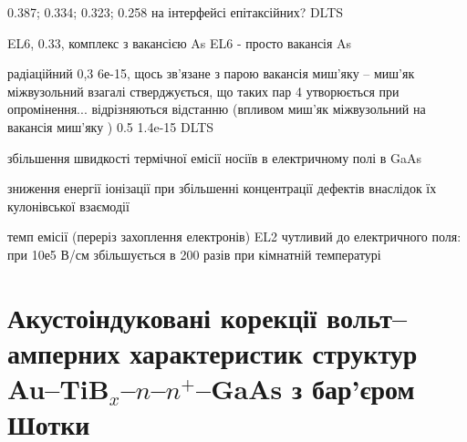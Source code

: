 \documentclass[a4paper,14pt,oneside,openany]{memoir}
\begin{document}
0.387; 0.334; 0.323; 0.258 на інтерфейсі епітаксійних?
DLTS
\cite{Yousefi1995}

EL6, 0.33, комплекс з вакансією As \cite{EL6:Richter}
EL6 - просто вакансія As \cite{EL6:Schultz}

радіаційний 0,3 6е-15, щось зв'язане з парою вакансія миш'яку -- миш'як міжвузольний
взагалі стверджується, що таких пар 4 утворюється при опромінення... відрізняються відстанню (впливом миш'як міжвузольний на вакансія миш'яку )
0.5 1.4e-15
DLTS
\cite{Pons}

збільшення швидкості термічної емісії носіїв в електричному полі в GaAs \cite{Bulyarskii2000r,Makram}

зниження енергії іонізації при збільшенні концентрації дефектів внаслідок їх кулонівської взаємодії \cite{Stellmacher}

темп емісії (переріз захоплення електронів) EL2 чутливий до електричного поля: при 10е5 В/см збільшується в 200 разів при кімнатній температурі \cite{Bourgoin2001}





%




\section{Акустоіндуковані корекції вольт--амперних характеристик структур Au--TiB$_x$--$n$--$n^+$--GaAs з бар'єром Шотки\label{MSGA}}
\end{document}
